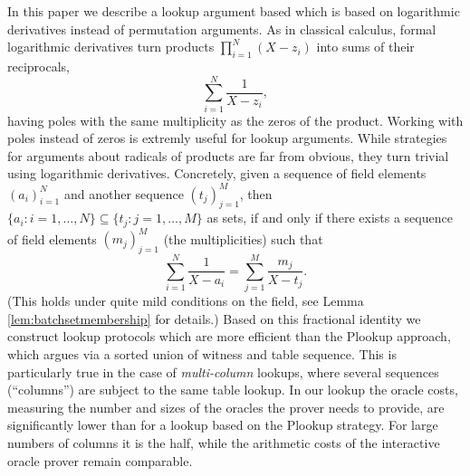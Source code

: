 \documentclass[11pt]{article}
\theoremstyle{definition}
\theoremstyle{remark}
\begin{document}
In this paper we describe a lookup argument based which is based on logarithmic derivatives instead of permutation arguments. 
As in classical calculus, formal logarithmic derivatives turn products $\prod_{i=1}^N (X - z_i)$ into sums of their reciprocals, 
\[
\sum_{i=1}^N \frac{1}{X - z_i},
\]
having poles with the same multiplicity as the zeros of the product.
Working with poles instead of zeros is extremly useful for lookup arguments.
While strategies for arguments about radicals of products are far from obvious, they turn trivial using logarithmic derivatives.
Concretely, given a sequence of field elements $(a_i)_{i=1}^N$ and another sequence $(t_j)_{j=1}^M$, then $\{a_i: i =1,\ldots, N\}\subseteq \{t_j : j=1,\ldots, M\}$ as sets, if and only if there exists a sequence of field elements $(m_j)_{j=1}^M$ (the multiplicities) such that
\begin{equation*}
\label{e:intro:lookup:eq}
\sum_{i=1}^N \frac{1}{X - a_i}  = \sum_{j=1}^M \frac{m_j}{X - t_j}.
\end{equation*}
 (This holds under quite mild conditions on the field, see Lemma \ref{lem:batchsetmembership} for details.)
Based on this fractional identity we construct lookup protocols which are more  efficient than the Plookup approach, which argues via a sorted union of witness and table sequence.
This is particularly true in the case of \textit{multi-column} lookups, where several sequences (``columns'') are subject to the same table lookup.
In our lookup the oracle costs, measuring the number and sizes of the oracles the prover needs to provide, are significantly lower than for a lookup based on the Plookup strategy.
For large numbers of columns it is the half, while the arithmetic costs of the interactive oracle prover remain comparable.
\end{document}
